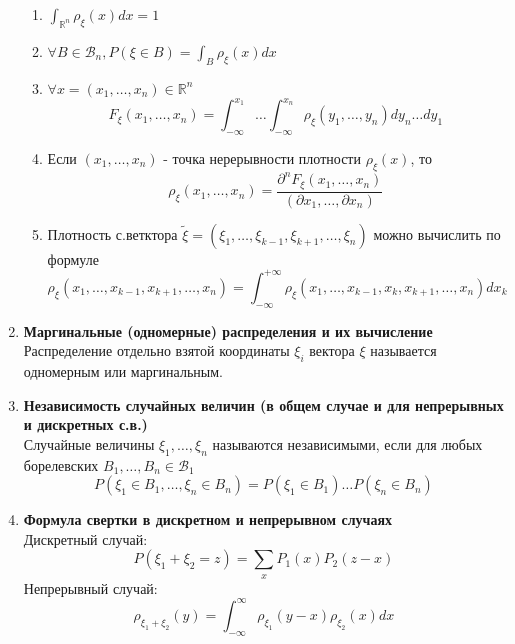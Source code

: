 \documentclass[A4]{article}
\begin{document}
\begin{enumerate}
\begin{enumerate}
			\item $\int_{\mathbb{R}^n} \rho_{\xi}(x)dx=1$
			\item $\forall B\in \mathcal{B}_n,P(\xi\in B)=\int_{B}\rho_{\xi}(x)dx$
			\item $\forall x=(x_1,\ldots,x_n)\in \mathbb{R}^n$
			\begin{equation}
			F_{\xi}(x_1,\ldots,x_n)=\int_{-\infty}^{x_1}\ldots\int_{-\infty}^{x_n}\rho_{\xi}(y_1,\ldots,y_n)dy_n\ldots dy_1
			\end{equation}
			\item Если $(x_1,\ldots,x_n)$ - точка нерерывности плотности $\rho_{\xi}(x)$, то
			\begin{equation}
			\rho_{\xi}(x_1,\ldots,x_n)=\frac{\partial^nF_{\xi}(x_1,\ldots,x_n)}{(\partial x_1,\ldots,\partial x_n)}
			\end{equation}
			\item Плотность с.ветктора $\tilde{\xi}=(\xi_1,\ldots,\xi_{k-1},\xi_{k+1},\ldots,\xi_n)$ можно вычислить по формуле
			\begin{equation}
			\rho_{\xi}(x_1,\ldots,x_{k-1},x_{k+1},\ldots,x_n)=\int_{-\infty}^{+\infty}\rho_{\xi}(x_1,\ldots,x_{k-1},x_k,x_{k+1},\ldots,x_n)dx_k
			\end{equation}
		\end{enumerate}
	\item \textbf{Маргинальные (одномерные) распределения и их вычисление}\\
	Распределение отдельно взятой координаты $\xi_i$ вектора $\xi$ называется одномерным или маргинальным.
	\item \textbf{Независимость случайных величин (в общем случае и для непрерывных и дискретных с.в.)}\\
	Случайные величины $\xi_1,\ldots,\xi_n$ называются независимыми, если для любых борелевских $B_1,\ldots,B_n\in\mathcal{B}_1$
	\begin{equation}
	P(\xi_1\in B_1,\ldots,\xi_n\in B_n)=P(\xi_1\in B_1)\ldots P(\xi_n\in B_n)
	\end{equation}
	\item \textbf{Формула свертки в дискретном и непрерывном случаях}\\
	Дискретный случай:
	\begin{equation}
	P(\xi_1+\xi_2=z)=\sum_{x}P_1(x)P_2(z-x)
	\end{equation}
	Непрерывный случай:
	\begin{equation}
	\rho_{\xi_1+\xi_2}(y)=\int_{-\infty}^{\infty} \rho_{\xi_1}(y-x)\rho_{\xi_2}(x)dx
	\end{equation}

\end{enumerate}
\end{document}
